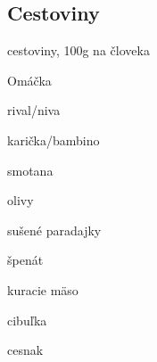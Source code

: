 \setcounter{step}{0}
\subsection{Cestoviny}

\begin{ingredient}
\begin{main}
	\item cestoviny, 100g na človeka
\end{main}
\begin{subingredient}{Omáčka}
	\item rival/niva
	\item karička/bambino
	\item smotana
	\item olivy
	\item sušené paradajky 
	\item špenát 
	\item kuracie mäso
	\item cibuľka 
	\item cesnak
\end{subingredient}
\end{ingredient}%
\begin{recipe}


\end{recipe}

\begin{notes}

\end{notes}	